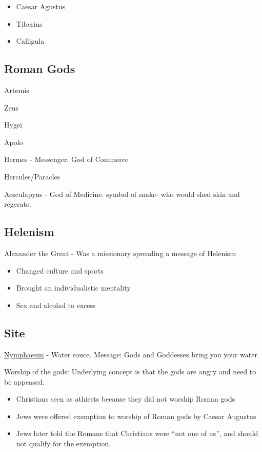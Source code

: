 \documentclass[
]{book}
\providecommand{\tightlist}{%
  \setlength{\itemsep}{0pt}\setlength{\parskip}{0pt}}
\begin{document}
\begin{itemize}
\tightlist
\item
  Caesar Agustus
\item
  Tiberius
\item
  Calligula
\end{itemize}

\hypertarget{roman-gods}{%
\subsection{Roman Gods}\label{roman-gods}}

Artemis

Zeus

Hygei

Apolo

Hermes - Messenger. God of Commerce

Hercules/Paracles

Aesculapyus - God of Medicine. symbol of snake- who would shed skin and regerate.

\hypertarget{helenism}{%
\subsection{Helenism}\label{helenism}}

Alexander the Great - Was a missionary spreading a message of Helenism

\begin{itemize}
\tightlist
\item
  Changed culture and sports
\item
  Brought an individualistic mentality
\item
  Sex and alcohol to excess
\end{itemize}

\hypertarget{site}{%
\subsection{Site}\label{site}}

\href{https://en.wikipedia.org/wiki/Nymphaeum}{Nymphaeum} - Water souce. Message: Gods and Goddesses bring you your water

Worship of the gods: Underlying concept is that the gods are angry and need to be appeased.

\begin{itemize}
\tightlist
\item
  Christians seen as athiests because they did not worship Roman gods
\item
  Jews were offered exemption to worship of Roman gods by Caesar Augustus
\item
  Jews later told the Romans that Christians were ``not one of us'', and should not qualify for the exemption.
\end{itemize}
\end{document}
